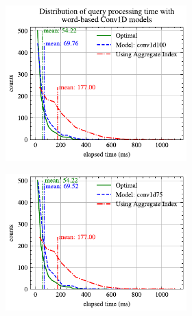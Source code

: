 \documentclass[conference]{IEEEtran}
\begin{document}
\begin{figure}[!h]
	\centering
	\begin{subfigure}{0.45\textwidth}
		\begin{subfigure}{\textwidth}
			\centering
			\includegraphics[]{graphics/perf_dist_conv1d100_B.pdf}
		\end{subfigure}
		\vfill
		\begin{subfigure}{\textwidth}
			\centering
			\includegraphics[]{graphics/perf_dist_conv1d75_B.pdf}
		\end{subfigure}
		\vfill
		\begin{subfigure}{\textwidth}
			\centering

\end{subfigure}
\end{subfigure}
\end{figure}
\end{document}
